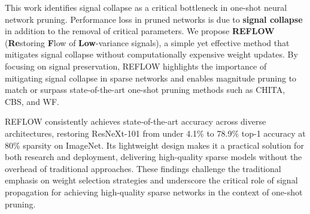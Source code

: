 This work identifies signal collapse as a critical bottleneck in one-shot neural network pruning. Performance loss in pruned networks is due to \textbf{signal collapse} in addition to the removal of critical parameters. We propose \textbf{REFLOW} (\textbf{Re}storing \textbf{F}low of \textbf{Low}-variance signals), a simple yet effective method that mitigates signal collapse without computationally expensive weight updates. By focusing on signal preservation, REFLOW highlights the importance of mitigating signal collapse in sparse networks and enables magnitude pruning to match or surpass state-of-the-art one-shot pruning methods such as CHITA, CBS, and WF.

REFLOW consistently achieves state-of-the-art accuracy across diverse architectures, restoring ResNeXt-101 from under 4.1\% to 78.9\% top-1 accuracy at 80\% sparsity on ImageNet. Its lightweight design makes it a practical solution for both research and deployment, delivering high-quality sparse models without the overhead of traditional approaches. These findings challenge the traditional emphasis on weight selection strategies and underscore the critical role of signal propagation for achieving high-quality sparse networks in the context of one-shot pruning.


